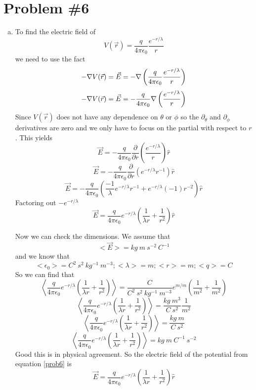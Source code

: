 \documentclass[11pt]{article}
\numberwithin{equation}{section}
\newcommand{\grad}{\bold\nabla}
\newcommand{\vecE}{\vec{E}}
\begin{document}
\section{Problem \#6}
\begin{enumerate}[(a)]
\item
To find the electric field of 
\begin{equation}
V(\vec{r}) = \frac{q}{4\pi\epsilon_0}\frac{e^{-r/\lambda}}{r}
\label{prob6}
\end{equation}
we need to use the fact
$$-\grad V(\vec{r}) = \vecE = -\grad\left(\frac{q}{4\pi\epsilon_0}\frac{e^{-r/\lambda}}{r}\right)$$
$$-\grad V(\vec{r}) = \vecE = -\frac{q}{4\pi\epsilon_0}\grad\left(\frac{e^{-r/\lambda}}{r}\right)$$
Since $V(\vec{r})$ does not have any dependence on $\theta$ or $\phi$ so the $\partial_{\theta}$ and $\partial_{\phi}$ derivatives are zero and we only have to focus on the partial with respect to $r$. This yields
$$\vecE = -\frac{q}{4\pi\epsilon_0}\frac{\partial}{\partial r}\left(\frac{e^{-r/\lambda}}{r}\right)\hat{r}$$
$$\vecE = -\frac{q}{4\pi\epsilon_0}\frac{\partial}{\partial r}\left(e^{-r/\lambda}r^{-1}\right)\hat{r}$$
$$\vecE = -\frac{q}{4\pi\epsilon_0}\left(\frac{-1}{\lambda}e^{-r/\lambda}r^{-1}+e^{-r/\lambda}(-1)r^{-2}\right)\hat{r}$$
Factoring out $-e^{-r/\lambda}$
$$\vecE = \frac{q}{4\pi\epsilon_0}e^{-r/\lambda}\left(\frac{1}{\lambda r}+\frac{1}{r^{2}}\right)\hat{r}$$

Now we can check the dimensions. We assume that
$$<\vecE> = kg\ m\ s^{-2}\ C^{-1}$$
and we know that
$$<\epsilon_0> = C^2\ s^2\ kg^{-1}\ m^{-3}; <\lambda> = m; <r> = m; <q>=C$$
So we can find that
$$\left< \frac{q}{4\pi\epsilon_0}e^{-r/\lambda}\left(\frac{1}{\lambda r}+\frac{1}{r^{2}}\right)\right> = \frac{C}{C^2\ s^2\ kg^{-1}\ m^{-3}}e^{m/m}\left(\frac{1}{m^2}+\frac{1}{m^2}\right)$$
$$\left< \frac{q}{4\pi\epsilon_0}e^{-r/\lambda}\left(\frac{1}{\lambda r}+\frac{1}{r^{2}}\right)\right> = \frac{kg\ m^3}{C\ s^2}\frac{1}{m^2}$$
$$\left< \frac{q}{4\pi\epsilon_0}e^{-r/\lambda}\left(\frac{1}{\lambda r}+\frac{1}{r^{2}}\right)\right> = \frac{kg\ m}{C\ s^2}$$
$$\left< \frac{q}{4\pi\epsilon_0}e^{-r/\lambda}\left(\frac{1}{\lambda r}+\frac{1}{r^{2}}\right)\right> = kg\ m\ C^{-1}\ s^{-2}$$
Good this is in physical agreement. So the electric field of the potential from equation \ref{prob6} is 
$$\vecE = \frac{q}{4\pi\epsilon_0}e^{-r/\lambda}\left(\frac{1}{\lambda r}+\frac{1}{r^{2}}\right)\hat{r}$$


\end{enumerate}
\end{document}
